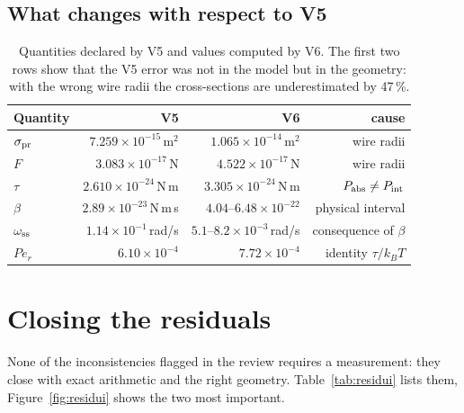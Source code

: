 \documentclass[11pt,a4paper]{article}
\providecommand{\toprule}{\hline}
\providecommand{\midrule}{\hline}
\providecommand{\bottomrule}{\hline}
\begin{document}
\subsection{What changes with respect to V5}

\begin{table}[H]
\centering\small
\caption{Quantities declared by V5 and values computed by V6. The first two rows show
that the V5 error was not in the model but in the geometry: with the wrong wire radii
the cross-sections are underestimated by 47\,\%.}
\label{tab:confronto}
\begin{tabular}{lrrr}
\toprule
Quantity & V5 & V6 & cause \\
\midrule
$\sigma_{\rm pr}$ & $7.259\times10^{-15}$\,m$^2$ & $1.065\times10^{-14}$\,m$^2$ & wire radii \\
$F$ & $3.083\times10^{-17}$\,N & $4.522\times10^{-17}$\,N & wire radii \\
$\tau$ & $2.610\times10^{-24}$\,N\,m & $3.305\times10^{-24}$\,N\,m & $P_{\rm abs}\neq P_{\rm int}$ \\
$\beta$ & $2.89\times10^{-23}$\,N\,m\,s & $4.04$--$6.48\times10^{-22}$ & physical interval \\
$\omega_{\rm ss}$ & $1.14\times10^{-1}$\,rad/s & $5.1$--$8.2\times10^{-3}$\,rad/s & consequence of $\beta$ \\
$Pe_r$ & $6.10\times10^{-4}$ & $7.72\times10^{-4}$ & identity $\tau/k_BT$ \\
\bottomrule
\end{tabular}
\end{table}

\section{Closing the residuals}

None of the inconsistencies flagged in the review requires a measurement: they close
with exact arithmetic and the right geometry. Table~\ref{tab:residui} lists them,
Figure~\ref{fig:residui} shows the two most important.
\end{document}
